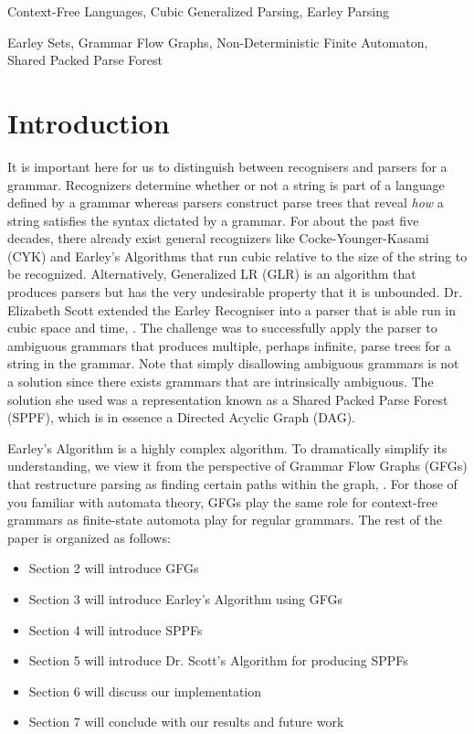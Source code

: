 \documentclass{sigplanconf}
\begin{document}

\terms
Context-Free Languages, Cubic Generalized Parsing, Earley Parsing 

\keywords
Earley Sets, Grammar Flow Graphs, Non-Deterministic Finite Automaton, Shared Packed Parse Forest

\section{Introduction}
It is important here for us to distinguish between recognisers and parsers for a grammar. Recognizers determine whether or not a string is part of a language defined by a grammar whereas parsers construct parse trees that reveal \textit{how} a string satisfies the syntax dictated by a grammar. For about the past five decades, there already exist general recognizers like Cocke-Younger-Kasami (CYK) and Earley's Algorithms that run cubic relative to the size of the string to be recognized. Alternatively, Generalized LR (GLR) is an algorithm that produces parsers but has the very undesirable property that it is unbounded. Dr. Elizabeth Scott extended the Earley Recogniser into a parser that is able run in cubic space and time, \cite{scott}. The challenge was to successfully apply the parser to ambiguous grammars that produces multiple, perhaps infinite, parse trees for a string in the grammar. Note that simply disallowing ambiguous grammars is not a solution since there exists grammars that are intrinsically ambiguous. The solution she used was a representation known as a Shared Packed Parse Forest (SPPF), which is in essence a Directed Acyclic Graph (DAG).

Earley's Algorithm is a highly complex algorithm. To dramatically simplify its understanding, we view it from the perspective of Grammar Flow Graphs (GFGs) that restructure parsing as finding certain paths within the graph, \cite{bilardi-pingali}. For those of you familiar with automata theory, GFGs play the same role for context-free grammars as finite-state automota play for regular grammars. The rest of the paper is organized as follows:
\begin{itemize}
\item Section 2 will introduce GFGs
\item Section 3 will introduce Earley's Algorithm using GFGs
\item Section 4 will introduce SPPFs
\item Section 5 will introduce Dr. Scott's Algorithm for producing SPPFs
\item Section 6 will discuss our implementation
\item Section 7 will conclude with our results and future work
\end{itemize}
\end{document}

